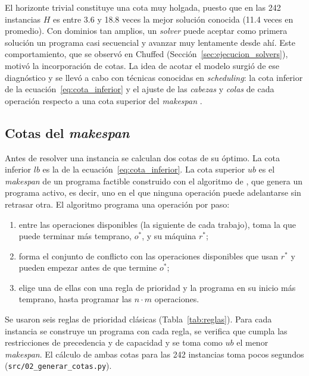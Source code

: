 El horizonte trivial constituye una cota muy holgada, puesto que en las 242
instancias $H$ es entre 3.6 y 18.8 veces la mejor solución conocida (11.4
veces en promedio). Con dominios tan amplios, un \textit{solver} puede aceptar
como primera solución un programa casi secuencial y avanzar muy lentamente
desde ahí. Este comportamiento, que se observó en Chuffed
(Sección~\ref{sec:ejecucion_solvers}), motivó la incorporación de cotas.
La idea de acotar el modelo surgió de ese diagnóstico y se llevó a cabo con
técnicas conocidas en \textit{scheduling}: la cota inferior de la
ecuación~\eqref{eq:cota_inferior} y el ajuste de las \textit{cabezas} y
\textit{colas} de cada operación respecto a una cota superior del
\textit{makespan} \citep{carlier1994}.

\subsection{Cotas del \textit{makespan}}
\label{sec:cotas}

Antes de resolver una instancia se calculan dos cotas de su óptimo. La cota
inferior $lb$ es la de la ecuación~\eqref{eq:cota_inferior}. La cota superior
$ub$ es el \textit{makespan} de un programa factible construido con el
algoritmo de \citet{giffler1960}, que genera un programa activo, es decir, uno
en el que ninguna operación puede adelantarse sin retrasar otra. El algoritmo
programa una operación por paso:

\begin{enumerate}
  \item entre las operaciones disponibles (la siguiente de cada trabajo), toma
    la que puede terminar más temprano, $o^{*}$, y su máquina $r^{*}$;
  \item forma el conjunto de conflicto con las operaciones disponibles que
    usan $r^{*}$ y pueden empezar antes de que termine $o^{*}$;
  \item elige una de ellas con una regla de prioridad y la programa en su
    inicio más temprano, hasta programar las $n \cdot m$ operaciones.
\end{enumerate}

\noindent Se usaron seis reglas de prioridad clásicas \citep{panwalkar1977}
(Tabla~\ref{tab:reglas}). Para cada instancia se construye un programa con
cada regla, se verifica que cumpla las restricciones de precedencia y de
capacidad y se toma como $ub$ el menor \textit{makespan}. El cálculo de ambas
cotas para las 242 instancias toma pocos segundos
(\texttt{src/02\_generar\_cotas.py}).

